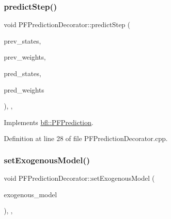 \subsubsection{\texorpdfstring{predict\+Step()}{predictStep()}}
{\footnotesize\ttfamily void P\+F\+Prediction\+Decorator\+::predict\+Step (\begin{DoxyParamCaption}\item[{const Eigen\+::\+Ref$<$ const Eigen\+::\+Matrix\+Xf $>$ \&}]{prev\+\_\+states,  }\item[{const Eigen\+::\+Ref$<$ const Eigen\+::\+Vector\+Xf $>$ \&}]{prev\+\_\+weights,  }\item[{Eigen\+::\+Ref$<$ Eigen\+::\+Matrix\+Xf $>$}]{pred\+\_\+states,  }\item[{Eigen\+::\+Ref$<$ Eigen\+::\+Vector\+Xf $>$}]{pred\+\_\+weights }\end{DoxyParamCaption})\hspace{0.3cm}{\ttfamily [override]}, {\ttfamily [protected]}, {\ttfamily [virtual]}}



Implements \mbox{\hyperlink{classbfl_1_1PFPrediction_a2488a3f3bf2345b4723d96cd7fda5491}{bfl\+::\+P\+F\+Prediction}}.



Definition at line 28 of file P\+F\+Prediction\+Decorator.\+cpp.

\mbox{\label{classbfl_1_1PFPredictionDecorator_a3c38ae386456ecd0fd1b609b381395ec}} 
\subsubsection{\texorpdfstring{set\+Exogenous\+Model()}{setExogenousModel()}}
{\footnotesize\ttfamily void P\+F\+Prediction\+Decorator\+::set\+Exogenous\+Model (\begin{DoxyParamCaption}\item[{std\+::unique\+\_\+ptr$<$ \mbox{\hyperlink{classbfl_1_1ExogenousModel}{Exogenous\+Model}} $>$}]{exogenous\+\_\+model }\end{DoxyParamCaption})\hspace{0.3cm}{\ttfamily [override]}, {\ttfamily [protected]}, {\ttfamily [virtual]}}



